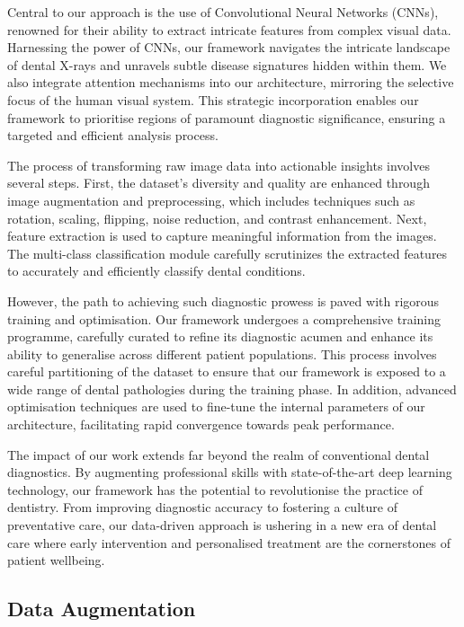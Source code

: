 \documentclass[journal,twoside,web]{ieeecolor}
\begin{document}
Central to our approach is the use of Convolutional Neural Networks (CNNs), renowned for their ability to extract intricate features from complex visual data. Harnessing the power of CNNs, our framework navigates the intricate landscape of dental X-rays and unravels subtle disease signatures hidden within them. We also integrate attention mechanisms into our architecture, mirroring the selective focus of the human visual system. This strategic incorporation enables our framework to prioritise regions of paramount diagnostic significance, ensuring a targeted and efficient analysis process.

The process of transforming raw image data into actionable insights involves several steps. First, the dataset's diversity and quality are enhanced through image augmentation and preprocessing, which includes techniques such as rotation, scaling, flipping, noise reduction, and contrast enhancement. Next, feature extraction is used to capture meaningful information from the images. The multi-class classification module carefully scrutinizes the extracted features to accurately and efficiently classify dental conditions.


However, the path to achieving such diagnostic prowess is paved with rigorous training and optimisation. Our framework undergoes a comprehensive training programme, carefully curated to refine its diagnostic acumen and enhance its ability to generalise across different patient populations. This process involves careful partitioning of the dataset to ensure that our framework is exposed to a wide range of dental pathologies during the training phase. In addition, advanced optimisation techniques are used to fine-tune the internal parameters of our architecture, facilitating rapid convergence towards peak performance.

The impact of our work extends far beyond the realm of conventional dental diagnostics. By augmenting professional skills with state-of-the-art deep learning technology, our framework has the potential to revolutionise the practice of dentistry. From improving diagnostic accuracy to fostering a culture of preventative care, our data-driven approach is ushering in a new era of dental care where early intervention and personalised treatment are the cornerstones of patient wellbeing.


\subsection{Data Augmentation}
\end{document}
